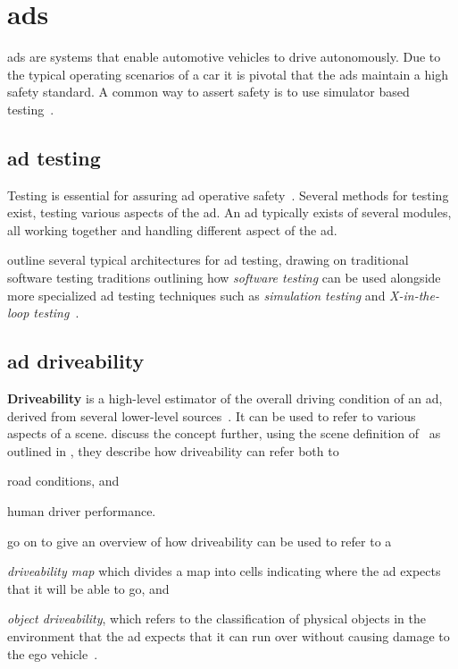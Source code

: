 \section{\acrfull{ads}}

\acrfull{ads} are systems that enable automotive vehicles to drive autonomously. Due to the
typical operating scenarios of a car it is pivotal that the \acrlong{ads} maintain a high safety standard. A common way to assert safety
is to use simulator based testing~\cite[1]{DeepScenario}.

\subsection{\acrlong{ad} testing}

Testing is essential for assuring \acrlong{ad} operative safety~\cite[163]{ADTestingReview16}.
Several methods for testing exist, testing various aspects of the \acrlong{ad}. An \acrshort{ad}
typically exists of several modules, all working together and handling different aspect of the
\acrlong{ad}.

\citeauthor{ADTestingReview16} outline several typical architectures for \acrshort{ad} testing,
drawing on traditional software testing traditions outlining how \textit{software testing} can be
used alongside more specialized \acrshort{ad} testing techniques such as \textit{simulation testing}
and \textit{X-in-the-loop testing}~\cite[163-164]{ADTestingReview16}.

\subsection{\acrlong{ad} driveability}\label{sec:adsDrivability}

\textbf{Driveability} is a high-level estimator of the overall driving
condition of an \acrshort{ad}, derived from several lower-level sources~\cite[3140]{safeToDrive}.
It can be used to refer to various aspects of a scene.
\citeauthor{safeToDrive} discuss the concept further, using the  scene definition
of~\citeauthor{scenes} as outlined in  , they describe
how driveability can refer both to \begin{inparaenum}
    \item road conditions, and
    \item human driver performance.
\end{inparaenum}
\citeauthor{safeToDrive} go on to give an overview of how driveability
can be used to refer to a \begin{inparaenum}\setcounter{enumi}{2}
    \item \textit{driveability map} which divides a map into
    cells indicating where the \acrshort{ad} expects that it will be able to go, and
    \item \textit{object driveability}, which refers to the classification of physical
    objects in the environment that the \acrshort{ad} expects that it can run over
    without causing damage to the ego vehicle~\cite[3135-3136]{safeToDrive}.
\end{inparaenum}

